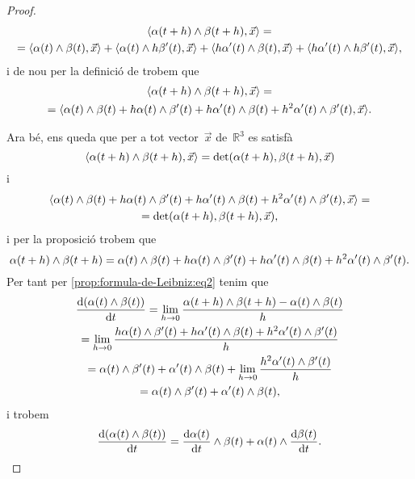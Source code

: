 \documentclass[../../main.tex]{subfiles}
\begin{document}
\begin{proof}
\begin{multline*}
            \prodesc{\alpha(t+h)\prodvec\beta(t+h)}{\vec{x}}=\\
            =\prodesc{\alpha(t)\prodvec\beta(t)}{\vec{x}}+\prodesc{\alpha(t)\prodvec h\beta'(t)}{\vec{x}}+\prodesc{h\alpha'(t)\prodvec\beta(t)}{\vec{x}}+\prodesc{h\alpha'(t)\prodvec h\beta'(t)}{\vec{x}},
        \end{multline*}
        i de nou per la definició de  trobem que
        \begin{multline*}
            \prodesc{\alpha(t+h)\prodvec\beta(t+h)}{\vec{x}}=\\
            =\prodesc{\alpha(t)\prodvec\beta(t)+h\alpha(t)\prodvec\beta'(t)+h\alpha'(t)\prodvec\beta(t)+h^{2}\alpha'(t)\prodvec \beta'(t)}{\vec{x}}.
        \end{multline*}

        Ara bé, ens queda que per a tot vector~\(\vec{x}\) de~\(\mathbb{R}^{3}\) es satisfà
        \[
            \prodesc{\alpha(t+h)\prodvec\beta(t+h)}{\vec{x}}=\det(\alpha(t+h),\beta(t+h),\vec{x})
        \]
        i
        \begin{multline*}
            \prodesc{\alpha(t)\prodvec\beta(t)+h\alpha(t)\prodvec\beta'(t)+h\alpha'(t)\prodvec\beta(t)+h^{2}\alpha'(t)\prodvec \beta'(t)}{\vec{x}}=\\=\det(\alpha(t+h),\beta(t+h),\vec{x}),
        \end{multline*}
        i per la proposició  trobem que
        \[
            \alpha(t+h)\mathbin{\wedge}\beta(t+h)=\alpha(t)\mathbin{\wedge}\beta(t)+h\alpha(t)\mathbin{\wedge}\beta'(t)+h\alpha'(t)\mathbin{\wedge}\beta(t)+h^{2}\alpha'(t)\mathbin{\wedge} \beta'(t).
        \]
        Per tant per \eqref{prop:formula-de-Leibniz:eq2} tenim que
        \begin{multline*}
            \frac{\mathop{}\!\mathrm{d}(\alpha(t)\mathbin{\wedge}\beta(t))}{\mathop{}\!\mathrm{d} t}=\lim_{h\to0}\frac{\alpha(t+h)\mathbin{\wedge}\beta(t+h)-\alpha(t)\mathbin{\wedge}\beta(t)}{h}\\
            =\lim_{h\to0}\frac{h\alpha(t)\mathbin{\wedge}\beta'(t)+h\alpha'(t)\mathbin{\wedge}\beta(t)+h^{2}\alpha'(t)\mathbin{\wedge} \beta'(t)}{h}\\
            =\alpha(t)\mathbin{\wedge}\beta'(t)+\alpha'(t)\mathbin{\wedge}\beta(t)+\lim_{h\to0}\frac{h^{2}\alpha'(t)\mathbin{\wedge} \beta'(t)}{h}\\
            =\alpha(t)\mathbin{\wedge}\beta'(t)+\alpha'(t)\mathbin{\wedge}\beta(t),
        \end{multline*}
        i trobem
        \[
            \frac{\mathop{}\!\mathrm{d}(\alpha(t)\mathbin{\wedge}\beta(t))}{\mathop{}\!\mathrm{d} t}=\frac{\mathop{}\!\mathrm{d}\alpha(t)}{\mathop{}\!\mathrm{d} t}\mathbin{\wedge}\beta(t)+\alpha(t)\mathbin{\wedge}\frac{\mathop{}\!\mathrm{d}\beta(t)}{\mathop{}\!\mathrm{d} t}.\qedhere
        \]
    \end{proof}
\end{document}
